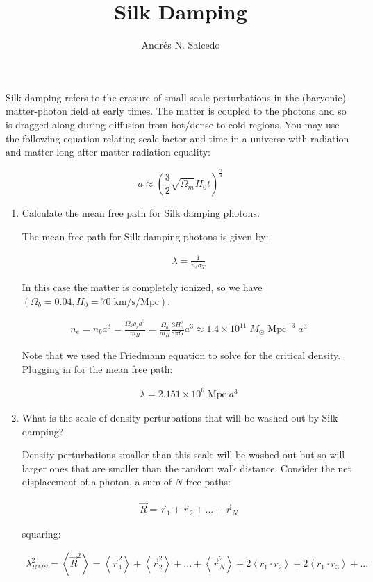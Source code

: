 \documentclass{article}
\title{Silk Damping}
\author{Andr\'{e}s N. Salcedo}
\def\beq{\begin{eqnarray}}
\def\eeq{\end{eqnarray}}
\begin{document}
\maketitle

Silk damping refers to the erasure of small scale perturbations in the (baryonic) matter-photon field at early times. The matter is coupled to the photons and so is dragged along during diffusion from hot/dense to cold regions. You may use the following equation relating scale factor and time in a universe with radiation and matter long after matter-radiation equality:

$$ a \approx \left( \frac{3}{2} \sqrt{\Omega_m} H_0 t \right)^{\frac{2}{3}} $$

\begin{enumerate}

\item Calculate the mean free path for Silk damping photons.

  The mean free path for Silk damping photons is given by:

  \beq
  \lambda = \frac{1}{n_e \sigma_T}
  \eeq

  In this case the matter is completely ionized, so we have $(\Omega_b = 0.04, H_0 = 70 \; \mathrm{km/s/Mpc})$:

  \beq
  n_{e} = n_{b} a^3 = \frac{\Omega_{b} \rho_{c} a^3}{m_H} = \frac{\Omega_{b}}{m_H} \frac{3 H_0^2}{8 \pi G} a^3 \approx 1.4 \times 10^{11} \; M_{\odot} \; \mathrm{Mpc}^{-3} \; a^3
  \eeq

  Note that we used the Friedmann equation to solve for the critical density. Plugging in for the mean free path:

  \beq
  \lambda = 2.151 \times 10^6 \; \mathrm{Mpc} \; a^3
  \eeq
  
\item What is the scale of density perturbations that will be washed out by Silk damping?

  Density perturbations smaller than this scale will be washed out but so will larger ones that are smaller than the random walk distance. Consider the net displacement of a photon, a sum of $N$ free paths:

  \beq
  \vec{R} = \vec{r}_1 + \vec{r}_2 + ... +\vec{r}_N
  \eeq

  squaring:

  \beq
  \lambda_{RMS}^2 = \left< \vec{R}^2 \right> = \left< \vec{r}^2_1 \right> + \left< \vec{r}^2_2 \right> + ... + \left< \vec{r}^2_N \right> + 2 \left< r_1 \cdot r_2 \right> + 2 \left< r_1 \cdot r_3 \right> + ...
  \eeq


\end{enumerate}
\end{document}
